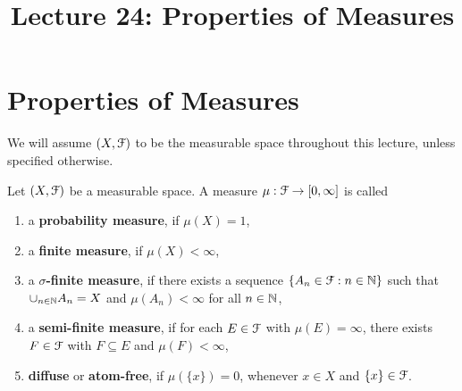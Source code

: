 \documentclass[a4paper,english,12pt]{article}
\title{Lecture 24: Properties of Measures}
\author{}
\begin{document}
\maketitle

\section{Properties of Measures}
We will assume $(X, \mathcal{F})$ to be the measurable space throughout this lecture, unless specified otherwise.
\begin{defn} Let $(X, \mathcal{F})$ be a measurable space. A measure $\mu: \mathcal{F} \to [0, \infty]$ is called 
\begin{enumerate}
	\item a \textbf{probability measure}, if $\mu(X) = 1$,
	\item a \textbf{finite measure}, if $\mu(X) < \infty$,
	\item a \textbf{$\sigma$-finite measure}, if there exists a sequence $\{A_n \in \mathcal{F}: n \in \mathbb{N}\}$ such that $\cup_{n \in \mathbb{N}}A_n = X$ and $\mu(A_n) < \infty$ for all $n \in \mathbb{N}$,
	\item a \textbf{semi-finite measure}, if for each $E \in \mathcal{F}$ with $\mu(E) = \infty$, there exists $F \in \mathcal{F}$ with $F \subseteq E$ and $\mu(F) < \infty$,
	\item \textbf{diffuse} or \textbf{atom-free}, if $\mu(\{x\}) = 0$, whenever $x \in X$ and $\{x\} \in \mathcal{F}$.
\end{enumerate}
\end{defn}
\end{document}
